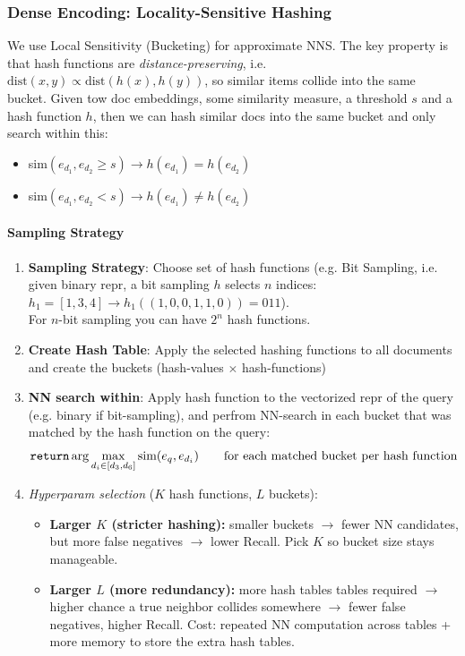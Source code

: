 \documentclass{article}
\begin{document}
\subsubsection{Dense Encoding: Locality-Sensitive Hashing}
We use Local Sensitivity (Bucketing) for approximate NNS. The key property is that hash functions are \textit{distance-preserving}, i.e. $\text{dist}(x,y)\propto \text{dist}(h(x),h(y))$, so similar items collide into the same bucket. Given tow doc embeddings, some similarity measure, a threshold $s$ and a hash function $h$, then we can hash similar docs into the same bucket and only search within this:
\begin{itemize}
    \item sim$(e_{d_1}, e_{d_2}\geq s) \rightarrow h(e_{d_1})=h(e_{d_2})$
    \item sim$(e_{d_1}, e_{d_2}< s) \rightarrow h(e_{d_1})\neq h(e_{d_2})$
\end{itemize}

\paragraph{Sampling Strategy}
\begin{enumerate}
    \item \textbf{Sampling Strategy}: Choose set of hash functions (e.g. Bit Sampling, i.e. given binary repr, a bit sampling $h$ selects $n$ indices: $h_1 = [1,3,4] \rightarrow h_1((1,0,0,1,1,0))= 011$). \\

    For $n$-bit sampling you can have $2^n$ hash functions.

    \item \textbf{ Create Hash Table}: Apply the selected hashing functions to all documents and create the buckets (hash-values $\times$ hash-functions)

    \item \textbf{NN search within}: Apply hash function to the vectorized repr of the query (e.g. binary if bit-sampling), and perfrom NN-search in each bucket that was matched by the hash function on the query: 
    $$
    \verb|return| \arg \max_{d_i \in [d_3, d_6]}\text{sim}(e_q,e_{d_i}) \qquad \text{for each matched bucket per hash function}
    $$

    \item \textit{Hyperparam selection} ($K$ hash functions, $L$ buckets):
    \begin{itemize}
        \item \textbf{Larger $K$ (stricter hashing):} smaller buckets $\to$ fewer NN candidates, but more false negatives $\to$ lower Recall. Pick $K$ so bucket size stays manageable.
        \item \textbf{Larger $L$ (more redundancy):} more hash tables tables required $\to$ higher chance a true neighbor collides somewhere $\to$ fewer false negatives, higher Recall. Cost: repeated NN computation across tables + more memory to store the extra hash tables.
    \end{itemize}
\end{enumerate}
\end{document}
